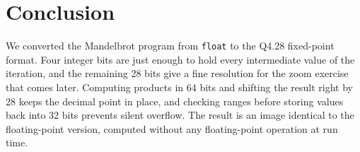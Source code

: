 \documentclass[11pt,a4paper]{article}
\begin{document}
\section{Conclusion}

We converted the Mandelbrot program from \texttt{float} to the Q4.28
fixed-point format. Four integer bits are just enough to hold every
intermediate value of the iteration, and the remaining 28 bits give a fine
resolution for the zoom exercise that comes later. Computing products in
64 bits and shifting the result right by 28 keeps the decimal point in place,
and checking ranges before storing values back into 32 bits prevents silent
overflow. The result is an image identical to the floating-point version,
computed without any floating-point operation at run time.
\end{document}

